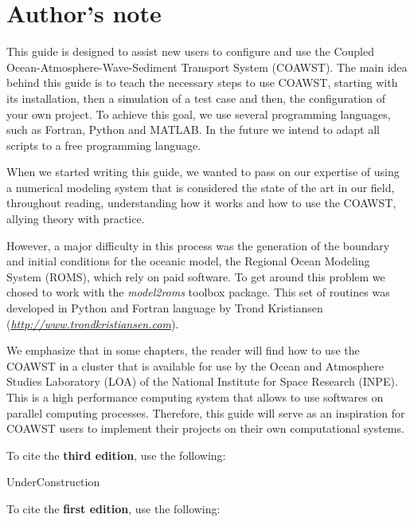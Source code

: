 \chapter*{Author's note}
\bigskip
\noindent This guide is designed to assist new users to configure and use the Coupled Ocean-Atmosphere-Wave-Sediment Transport System (COAWST).
The main idea behind this  guide is to teach the necessary steps to use COAWST, starting with its installation, then a simulation of a test case and 
then, the configuration of your own project. To achieve this goal, we use several programming languages, such as Fortran, Python and MATLAB. In the future we intend to adapt all scripts
to a free programming language.
\bigskip

\noindent When we started writing this guide, we wanted to pass on our expertise of using a numerical modeling system that is considered the state of the art in our field, 
throughout reading, understanding how it works and how to use the COAWST, allying theory with practice.
\bigskip

\noindent However, a major difficulty in this process was the generation of the boundary and initial conditions for the oceanic model, the Regional Ocean Modeling System (ROMS),
which rely on paid software. To get around this problem we chosed to work with the \textit {model2roms} toolbox package. This set of routines was developed in Python and 
Fortran language by Trond Kristiansen (\textit{\textcolor{bleu_cite} {\href{http://www.trondkristiansen.com}{http://www.trondkristiansen.com}}}).
\bigskip

\noindent We emphasize that in some chapters, the reader will find how to use the COAWST in a cluster that is available for use by the Ocean and Atmosphere 
Studies Laboratory (LOA) of the National Institute for Space Research (INPE). This is a high performance computing system that allows to use softwares on 
parallel computing processes. Therefore, this guide will serve as an inspiration for COAWST users to implement their projects on their own computational systems.
\bigskip

\noindent To cite the \textbf{third edition}, use the following:
\bigskip

\noindent UnderConstruction

\bigskip
\pagebreak 

\noindent To cite the \textbf{first edition}, use the following:

